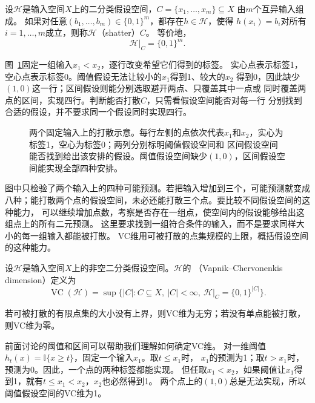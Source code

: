 \begin{definition}[打散]
\label{def:shattering}
设$\mathcal H$是输入空间$X$上的二分类假设空间，$C=\{x_1,\ldots,x_m\}\subseteq X$
由$m$个互异输入组成。
如果对任意$(b_1,\ldots,b_m)\in\{0,1\}^m$，都存在$h\in\mathcal H$，使得
$h(x_i)=b_i$对所有$i=1,\ldots,m$成立，则称$\mathcal H$（shatter）$C$。
等价地，
\[
 \mathcal H|_C=\{0,1\}^m.
\]
\end{definition}

图~\ref{fig:learning-vc-shattering}固定一组输入$x_1<x_2$，逐行改变希望它们得到的标签。
实心点表示标签1，空心点表示标签0。阈值假设无法让较小的$x_1$得到1、较大的$x_2$
得到0，因此缺少$(1,0)$这一行；区间假设则能分别选取避开两点、只覆盖其中一点或
同时覆盖两点的区间，实现四行。判断能否打散$C$，只需看假设空间能否对每一行
分别找到合适的假设，并不要求同一个假设同时实现四行。

\begin{figure}[htbp]
  \centering
  
  \caption{两个固定输入上的打散示意。每行左侧的点依次代表$x_1$和$x_2$，实心为标签1，空心为标签0；两列分别标明阈值假设空间和
  区间假设空间能否找到给出该安排的假设。阈值假设空间缺少$(1,0)$，区间假设空间能实现全部四种安排。}
  \label{fig:learning-vc-shattering}
\end{figure}

图中只检验了两个输入上的四种可能预测。若把输入增加到三个，可能预测就变成
八种；能打散两个点的假设空间，未必还能打散三个点。要比较不同假设空间的这种能力，
可以继续增加点数，考察是否存在一组点，使空间内的假设能够给出这组点上的所有二元预测。
这里要求找到一组符合条件的输入，而不是要求同样大小的每一组输入都能被打散。
VC维用可被打散的点集规模的上限，概括假设空间的这种能力。

\begin{definition}[VC维]
\label{def:vc-dimension}
设$\mathcal H$是输入空间$X$上的非空二分类假设空间。$\mathcal H$的
（Vapnik--Chervonenkis dimension）定义为
\[
 \operatorname{VC}(\mathcal H)
 =\sup\bigl\{|C|:C\subseteq X,\ |C|<\infty,\
 \mathcal H|_C=\{0,1\}^{|C|}\bigr\}.
\]
\end{definition}

若可被打散的有限点集的大小没有上界，则VC维为无穷；若没有单点能被打散，则VC维为零。

前面讨论的阈值和区间可以帮助我们理解如何确定VC维。
对一维阈值$h_t(x)=\mathbb I\{x\geq t\}$，固定一个输入$x_1$。取$t\leq x_1$时，
$x_1$的预测为1；取$t>x_1$时，预测为0。因此，一个点的两种标签都能实现。
但任取$x_1<x_2$，如果阈值让$x_1$得到1，就有$t\leq x_1<x_2$，$x_2$也必然得到1。
两个点上的$(1,0)$总是无法实现，所以阈值假设空间的VC维为1。

